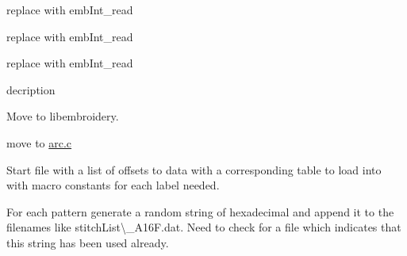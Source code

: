 \begin{DoxyRefList}
%
replace with emb\+Int\+\_\+read  
\item[Member \mbox{\hyperlink{formats_8c_a760e806c16c1612a6b5ca5a26bc736d1}{binary\+Write\+UShort}} (FILE $\ast$f, unsigned short data)]\label{todo__todo000197}%
%
replace with emb\+Int\+\_\+read  
\item[Member \mbox{\hyperlink{formats_8c_ac93ea02c7dfc79fb81e7e7cc5acea14a}{binary\+Write\+UShort\+BE}} (FILE $\ast$f, unsigned short data)]\label{todo__todo000198}%
%
replace with emb\+Int\+\_\+read  
\item[Member \mbox{\hyperlink{main_8c_a5d7bf5f964ae87921bab916b871ea2dd}{copy\+\_\+trim}} (char const $\ast$s)]\label{todo__todo000205}%
%
decription  
\item[Member \mbox{\hyperlink{utility_8cpp_a1291ffefd4b741c0b342ed03934c431d}{emb\+\_\+clamp}} (Emb\+Real lower, Emb\+Real x, Emb\+Real upper)]\label{todo__todo000014}%
%
Move to libembroidery.  
\item[Member \mbox{\hyperlink{main_8c_a16e1e46c5c33874fc9a63476e70c0d66}{emb\+Arc\+\_\+print}} (Emb\+Arc arc)]\label{todo__todo000204}%
%
move to \mbox{\hyperlink{arc_8c}{arc.\+c}}  
\item[Page \mbox{\hyperlink{md_extern_libembroidery_src_embedded}{embedded}} ]\label{todo__todo000179}%
%
Start file with a list of offsets to data with a corresponding table to load into with macro constants for each label needed.

\label{todo__todo000180}%
%
For each pattern generate a random string of hexadecimal and append it to the filenames like {\ttfamily stitch\+List\textbackslash{}\+\_\+\+A16\+F.\+dat}. Need to check for a file which indicates that this string has been used already.


\end{DoxyRefList}
